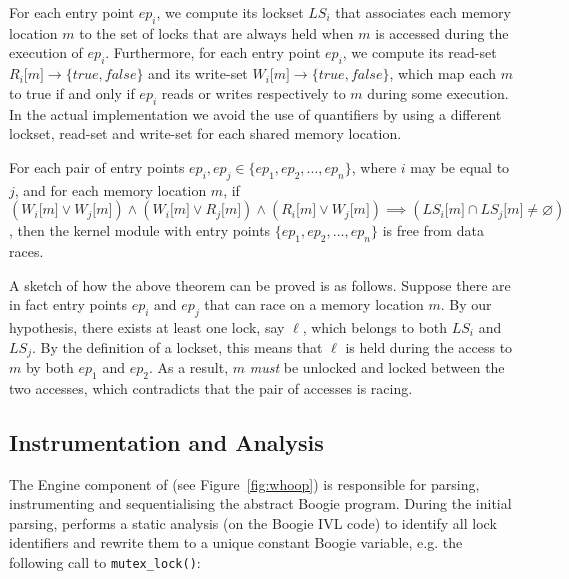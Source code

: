 For each entry point $\mathit{ep}_{i}$, we compute its lockset $\mathit{LS}_{i}$ that associates each memory location $m$ to the set of locks that are always held when $m$ is accessed during the execution of $\mathit{ep}_{i}$. Furthermore, for each entry point $\mathit{ep}_{i}$, we compute its read-set $R_{i}\lbrack m\rbrack \rightarrow \{true, false\}$ and its write-set $W_{i}\lbrack m\rbrack \rightarrow \{true, false\}$, which map each $m$ to true if and only if $\mathit{ep}_{i}$ reads or writes respectively to $m$ during some execution. In the actual implementation we avoid the use of quantifiers by using a different lockset, read-set and write-set for each shared memory location. 

\begin{theorem}
\label{theorem:locksets}
For each pair of entry points $\mathit{ep}_{i}, \mathit{ep}_{j}\in \{\mathit{ep}_{1}, \mathit{ep}_{2}, ..., \mathit{ep}_{n}\}$, where $i$ may be equal to $j$, and for each memory location $m$, if $(W_{i}\lbrack m\rbrack \vee W_{j}\lbrack m\rbrack) \wedge (W_{i}\lbrack m\rbrack \vee R_{j}\lbrack m\rbrack) \wedge (R_{i}\lbrack m\rbrack \vee W_{j}\lbrack m\rbrack) \implies (\mathit{LS}_{i}\lbrack m\rbrack \cap \mathit{LS}_{j}\lbrack m\rbrack \not= \varnothing)$, then the kernel module with entry points $\{\mathit{ep}_{1}, \mathit{ep}_{2}, \dotsc, \mathit{ep}_{n}\}$ is free from data races.
\end{theorem}

A sketch of how the above theorem can be proved is as follows. Suppose there are in fact entry points $\mathit{ep}_{i}$ and $\mathit{ep}_{j}$ that can race on a memory location $m$. By our hypothesis, there exists at least one lock, say $\ell$, which belongs to both $\mathit{LS}_{i}$ and $\mathit{LS}_{j}$. By the definition of a lockset, this means that $\ell$ is held during the access to $m$ by both $ep_1$ and $ep_2$. As a result, $m$ \emph{must} be unlocked and locked between the two accesses, which contradicts that the pair of accesses is racing.

\subsection{Instrumentation and Analysis}
\label{tech:method}

The Engine component of \whoop (see Figure~\ref{fig:whoop}) is responsible for parsing, instrumenting and sequentialising the abstract Boogie program. During the initial parsing, \whoop performs a static analysis (on the Boogie IVL code) to identify all lock identifiers and rewrite them to a unique constant Boogie variable, e.g. the following call to \texttt{mutex\_lock()}:


